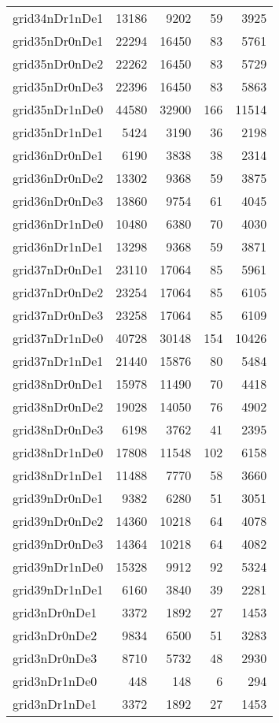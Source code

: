 \begin{tabular}{lrrrr}
grid34nDr1nDe1 & 13186 & 9202 & 59 & 3925 \\
grid35nDr0nDe1 & 22294 & 16450 & 83 & 5761 \\
grid35nDr0nDe2 & 22262 & 16450 & 83 & 5729 \\
grid35nDr0nDe3 & 22396 & 16450 & 83 & 5863 \\
grid35nDr1nDe0 & 44580 & 32900 & 166 & 11514 \\
grid35nDr1nDe1 & 5424 & 3190 & 36 & 2198 \\
grid36nDr0nDe1 & 6190 & 3838 & 38 & 2314 \\
grid36nDr0nDe2 & 13302 & 9368 & 59 & 3875 \\
grid36nDr0nDe3 & 13860 & 9754 & 61 & 4045 \\
grid36nDr1nDe0 & 10480 & 6380 & 70 & 4030 \\
grid36nDr1nDe1 & 13298 & 9368 & 59 & 3871 \\
grid37nDr0nDe1 & 23110 & 17064 & 85 & 5961 \\
grid37nDr0nDe2 & 23254 & 17064 & 85 & 6105 \\
grid37nDr0nDe3 & 23258 & 17064 & 85 & 6109 \\
grid37nDr1nDe0 & 40728 & 30148 & 154 & 10426 \\
grid37nDr1nDe1 & 21440 & 15876 & 80 & 5484 \\
grid38nDr0nDe1 & 15978 & 11490 & 70 & 4418 \\
grid38nDr0nDe2 & 19028 & 14050 & 76 & 4902 \\
grid38nDr0nDe3 & 6198 & 3762 & 41 & 2395 \\
grid38nDr1nDe0 & 17808 & 11548 & 102 & 6158 \\
grid38nDr1nDe1 & 11488 & 7770 & 58 & 3660 \\
grid39nDr0nDe1 & 9382 & 6280 & 51 & 3051 \\
grid39nDr0nDe2 & 14360 & 10218 & 64 & 4078 \\
grid39nDr0nDe3 & 14364 & 10218 & 64 & 4082 \\
grid39nDr1nDe0 & 15328 & 9912 & 92 & 5324 \\
grid39nDr1nDe1 & 6160 & 3840 & 39 & 2281 \\
grid3nDr0nDe1 & 3372 & 1892 & 27 & 1453 \\
grid3nDr0nDe2 & 9834 & 6500 & 51 & 3283 \\
grid3nDr0nDe3 & 8710 & 5732 & 48 & 2930 \\
grid3nDr1nDe0 & 448 & 148 & 6 & 294 \\
grid3nDr1nDe1 & 3372 & 1892 & 27 & 1453 \\

\end{tabular}
